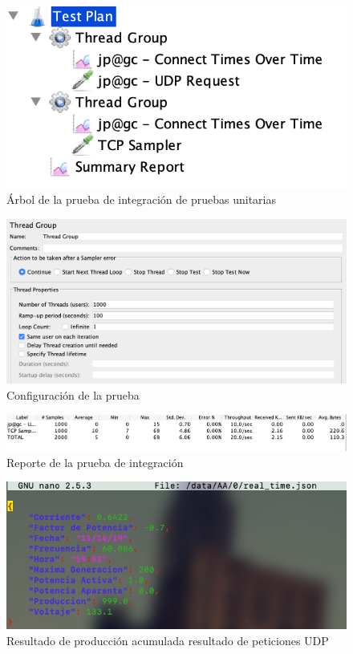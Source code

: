 \begin{figure}[H]
	\centering
	\includegraphics[scale=.5]{Capitulo5/images/test_integracion.png}
	\caption{Árbol de la prueba de integración de pruebas unitarias}
	\label{fig:test_integracion}
\end{figure}

\begin{figure}[H]
	\centering
	\includegraphics[scale=.4]{Capitulo5/images/test_integracion_config.png}
	\caption{Configuración de la prueba}
	\label{fig:test_integracion_config}
\end{figure}

\begin{figure}[H]
	\centering
	\includegraphics[scale=.5]{Capitulo5/images/test_integracion_summary.png}
	\caption{Reporte de la prueba de integración}
	\label{fig:test_integracion_reporte}
\end{figure}

\begin{figure}[H]
	\centering
	\includegraphics[scale=.5]{Capitulo5/images/test_integracion_udp.png}
	\caption{Resultado de producción acumulada resultado de peticiones UDP}
	\label{fig:test_integracion_udp}
\end{figure}


